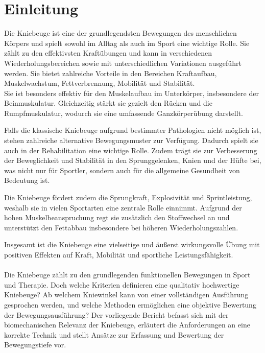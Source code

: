 \section{Einleitung}\label{sec:Einleitung} %
\noindent Die Kniebeuge ist eine der grundlegendsten Bewegungen des menschlichen Körpers und spielt sowohl im Alltag als auch im Sport eine wichtige Rolle. \cite{Straub2024SquatReview,Meinart} Sie zählt zu den effektivsten Kraftübungen und kann in verschiedenen Wiederholungsbereichen sowie mit unterschiedlichen Variationen ausgeführt werden. Sie bietet zahlreiche Vorteile in den Bereichen Kraftaufbau, Muskelwachstum, Fettverbrennung, Mobilität und Stabilität. \cite{Lindberg2023SquatBenefits}
\\
\noindent Sie ist besonders effektiv für den Muskelaufbau im Unterkörper, insbesondere der Beinmuskulatur. Gleichzeitig stärkt sie gezielt den Rücken und die Rumpfmuskulatur, wodurch sie eine umfassende Ganzkörperübung darstellt. \cite{Schoenfeld2010,Meinart} 

\noindent Falls die klassische Kniebeuge aufgrund bestimmter Pathologien nicht möglich ist, stehen zahlreiche alternative Bewegungsmuster zur Verfügung. Dadurch spielt sie auch in der Rehabilitation eine wichtige Rolle. Zudem trägt sie zur Verbesserung der Beweglichkeit und Stabilität in den Sprunggelenken, Knien und der Hüfte bei, was nicht nur für Sportler, sondern auch für die allgemeine Gesundheit von Bedeutung ist. \cite{Hartmann2014,Lindberg2023SquatBenefits} 

\noindent Die Kniebeuge fördert zudem die Sprungkraft, Explosivität und Sprintleistung, weshalb sie in vielen Sportarten eine zentrale Rolle einnimmt. Aufgrund der hohen Muskelbeanspruchung regt sie zusätzlich den Stoffwechsel an und unterstützt den Fettabbau insbesondere bei höheren Wiederholungszahlen. \cite{Lindberg2023SquatBenefits}

\noindent Insgesamt ist die Kniebeuge eine vielseitige und äußerst wirkungsvolle Übung mit positiven Effekten auf Kraft, Mobilität und sportliche Leistungsfähigkeit. \cite{Hartmann2014,Lindberg2023SquatBenefits,Meinart} 
\\
\\
\noindent Die Kniebeuge zählt zu den grundlegenden funktionellen Bewegungen in Sport und Therapie. Doch welche Kriterien definieren eine qualitativ hochwertige Kniebeuge? Ab welchem Kniewinkel kann von einer vollständigen Ausführung gesprochen werden, und welche Methoden ermöglichen eine objektive Bewertung der Bewegungsausführung?
\noindent Der vorliegende Bericht befasst sich mit der biomechanischen Relevanz der Kniebeuge, erläutert die Anforderungen an eine korrekte Technik und stellt Ansätze zur Erfassung und Bewertung der Bewegungstiefe vor.